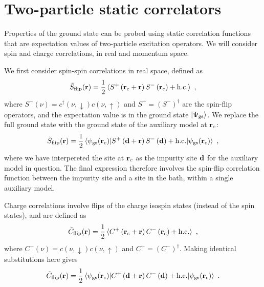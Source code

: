 \documentclass[reprint,hidelinks]{revtex4-2}
\begin{document}
\section{Two-particle static correlators}
Properties of the ground state can be probed using static correlation functions that are expectation values of two-particle excitation operators. We will consider spin and charge correlations, in real and momentum space.

We first consider spin-spin correlations in real space, defined as
\begin{equation}\begin{aligned}
	\tilde{S}_\text{flip}({\bf r}) = \frac{1}{2}\braket{S^+\left({\bf r}_c + {\bf r}\right)S^-\left({\bf r}_c\right) + \text{h.c.}}~,
\end{aligned}\end{equation}
where \(S^-(\nu) = c^\dagger(\nu,\downarrow)c(\nu, \uparrow)\) and \(S^+ = \left( S^- \right)^\dagger \) are the spin-flip operators, and the expectation value is in the ground state \(\ket{\Psi_\text{gs}}\). We replace the full ground state with the ground state of the auxiliary model at \({\bf r}_c\):
\begin{equation}\begin{aligned}
	\tilde{S}_\text{flip}({\bf r}) = \frac{1}{2}\braket{\psi_\text{gs}({\bf r}_c) | S^+\left({\bf d} + {\bf r}\right)S^-\left({\bf d}\right) + \text{h.c.} | \psi_\text{gs}({\bf r}_c)}~,
\end{aligned}\end{equation}
where we have interpereted the site at \({\bf r}_c\) as the impurity site \({\bf d}\) for the auxiliary model in question. The final expression therefore involves the spin-flip correlation function between the impurity site and a site in the bath, within a single auxiliary model.

Charge correlations involve flips of the charge isospin states (instead of the spin states), and are defined as
\begin{equation}\begin{aligned}
	\tilde{C}_\text{flip}({\bf r}) = \frac{1}{2}\braket{C^+\left({\bf r}_c + {\bf r}\right)C^-\left({\bf r}_c\right) + \text{h.c.}}~,
\end{aligned}\end{equation}
where \(C^-(\nu) = c(\nu,\downarrow)c(\nu, \uparrow)\) and \(C^+ = \left( C^- \right)^\dagger \). Making identical substitutions here gives
\begin{equation}\begin{aligned}
	\tilde{C}_\text{flip}({\bf r}) = \frac{1}{2}\braket{\psi_\text{gs}({\bf r}_c) | C^+\left({\bf d} + {\bf r}\right)C^-\left({\bf d}\right) + \text{h.c.} | \psi_\text{gs}({\bf r}_c)}~.
\end{aligned}\end{equation}
\end{document}
